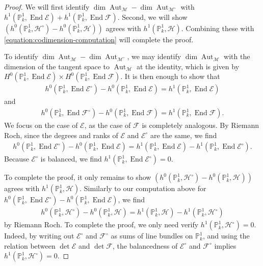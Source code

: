 \documentclass[12 pt]{amsart}
\theoremstyle{plain}
\theoremstyle{definition}
\theoremstyle{remark}
\numberwithin{equation}{section}
\newcommand\bp{\mathbb P}
\newcommand\sce{\mathscr E}
\newcommand\scf{\mathscr F}
\newcommand\sch{\mathscr H}
\newcommand\ce{\mathscr M} %
\DeclareMathOperator\End{End}
\DeclareMathOperator\aut{Aut}
\begin{document}
\begin{proof}
	We will first identify $\dim \aut_{\ce} - \dim \aut_{\ce^\circ}$ with
	$h^1(\bp^1_k, \End \sce)+
	h^1(\bp^1_k, \End \scf)$.  Second, we will show
	$(h^0(\bp^1_k, \sch^\circ) - h^0(\bp^1_k,
	\sch))$ agrees with
	$h^1(\bp^1_k, \sch)$.  Combining these with
	\eqref{equation:codimension-computation} will complete the proof.

	To identify $\dim \aut_{\ce} - \dim \aut_{\ce^\circ}$, we may identify
	$\dim \aut_{\ce}$ with the dimension of the tangent space to
	$\aut_{\ce}$ at the identity, which is given by $H^0(\bp^1_k, \End \sce)
	\times H^0(\bp^1_k, \End \scf)$.  It is then enough to show that
	\begin{align*} h^0(\bp^1_k, \End \sce^\circ) - h^0(\bp^1_k, \End \sce) =
	h^1(\bp^1_k, \End \sce) \end{align*} and
	\begin{align*} h^0(\bp^1_k, \End \scf^\circ) - h^0(\bp^1_k, \End
		\scf)
	= h^1(\bp^1_k, \End \scf). \end{align*} We focus on the case of
		$\sce$, as the case of $\scf$ is completely analogous.  By
		Riemann Roch, since the degrees and ranks of $\sce$ and
		$\sce^\circ$ are the same, we find \begin{align*} h^0(\bp^1_k,
			\End \sce^\circ) - h^0(\bp^1_k, \End \sce) =
			h^1(\bp^1_k, \End \sce) - h^1(\bp^1_k, \End \sce^\circ).
		\end{align*} Because $\sce^\circ$ is balanced, we find
		$h^1(\bp^1_k, \End \sce^\circ) = 0$.

	To complete the proof, it only remains to show $(h^0(\bp^1_k,
	\sch^\circ) - h^0(\bp^1_k, \sch))$ agrees with $h^1(\bp^1_k, \sch)$.  
	Similarly to our computation above for $h^0(\bp^1_k, \End
	\sce^\circ) - h^0(\bp^1_k, \End \sce)$,
	we find
	\begin{align*}
	h^0(\bp^1_k, \sch^\circ) - h^0(\bp^1_k,
	\sch) = h^1(\bp^1_k, \sch) - h^1(\bp^1_k,
	\sch^\circ)
	\end{align*}
	by Riemann Roch.  To complete the proof, we only need verify
	$h^1(\bp^1_k, \sch^\circ) = 0$. 
	Indeed, by writing out $\sce^\circ$ and $\scf^\circ$ as sums of line
		bundles on $\bp^1_k$, and using the relation between $\det \sce$
		and $\det \scf$, the balancedness of $\sce^\circ$ and
		$\scf^\circ$ implies $h^1(\bp^1_k, \sch^\circ) = 0$.
\end{proof}
\end{document}
